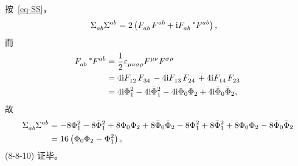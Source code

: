 \begin{xiti}
\begin{zm}
		按~\eqref{eq-SS}，
		\begin{align*}
			\tensor{\Sigma}{_a_b} \tensor{\Sigma}{^a^b} &= 2 \left( \tensor{F}{_a_b} \tensor{F}{^a^b} + \ii \tensor{F}{_a_b} \tensor[^*]{F}{^a^b} \right),
		\end{align*}
		而
		\begin{align*}
			\tensor{F}{_a_b} \tensor[^*]{F}{^a^b} &= \frac{1}{2} \tensor{\varepsilon}{_\mu_\nu_\sigma_\rho} \tensor{F}{^\mu^\nu} \tensor{F}{^\sigma^\rho}\\
			&= 4 \ii \tensor{F}{_1_2} \tensor{F}{_3_4} - 4 \ii \tensor{F}{_1_3} \tensor{F}{_2_4} + 4 \ii \tensor{F}{_1_4} \tensor{F}{_2_3}\\
			&= 4 \ii \Phi_1^2 - 4 \ii \bar{\Phi}_1^2 - 4 \ii \Phi_0 \Phi_2 + 4 \ii \bar{\Phi}_0 \bar{\Phi}_2,
		\end{align*}
		故
		\begin{align*}
			\tensor{\Sigma}{_a_b} \tensor{\Sigma}{^a^b} &= -8 \Phi_1^2 - 8 \bar{\Phi}_1^2 + 8 \Phi_0 \Phi_2 + 8 \bar{\Phi}_0 \bar{\Phi}_2 - 8 \Phi_1^2 + 8 \bar{\Phi}_1^2 + 8 \Phi_0 \Phi_2 - 8 \bar{\Phi}_0 \bar{\Phi}_2\\
			&= 16 \left( \Phi_0 \Phi_2 - \Phi_1^2 \right),
		\end{align*}
		(8-8-10) 证毕。
	\end{zm}
\end{xiti}
